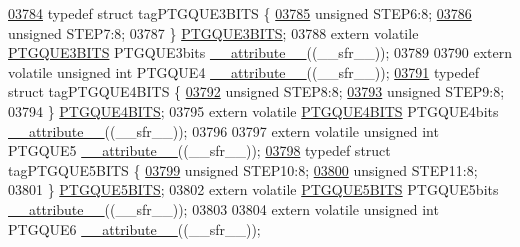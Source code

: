 \begin{DoxyCode}
\hypertarget{a00009_source_l03784}{}\hyperlink{a00008}{03784} \textcolor{keyword}{typedef} \textcolor{keyword}{struct }tagPTGQUE3BITS \{
\hypertarget{a00009_source_l03785}{}\hyperlink{a00008_af6169dff16fd1ea5e34a43bb97bd6218}{03785}   \textcolor{keywordtype}{unsigned} STEP6:8;
\hypertarget{a00009_source_l03786}{}\hyperlink{a00008_a4548344654e1258709b4f446bbe716df}{03786}   \textcolor{keywordtype}{unsigned} STEP7:8;
03787 \} \hyperlink{a00008_d2/d6e/a00667}{PTGQUE3BITS};
03788 \textcolor{keyword}{extern} \textcolor{keyword}{volatile} \hyperlink{a00008_d2/d6e/a00667}{PTGQUE3BITS} PTGQUE3bits \hyperlink{a00009_a493c46f03454991ccc5aa7a6e1dfb2a7}{\_\_attribute\_\_}((\_\_sfr\_\_));
03789 
03790 \textcolor{keyword}{extern} \textcolor{keyword}{volatile} \textcolor{keywordtype}{unsigned} \textcolor{keywordtype}{int}  PTGQUE4 \hyperlink{a00009_a493c46f03454991ccc5aa7a6e1dfb2a7}{\_\_attribute\_\_}((\_\_sfr\_\_));
\hypertarget{a00009_source_l03791}{}\hyperlink{a00008}{03791} \textcolor{keyword}{typedef} \textcolor{keyword}{struct }tagPTGQUE4BITS \{
\hypertarget{a00009_source_l03792}{}\hyperlink{a00008_aa67987ffd757f896712bf2aa6d181b7f}{03792}   \textcolor{keywordtype}{unsigned} STEP8:8;
\hypertarget{a00009_source_l03793}{}\hyperlink{a00008_a85e0900404fd65941708a683dfb7c06a}{03793}   \textcolor{keywordtype}{unsigned} STEP9:8;
03794 \} \hyperlink{a00008_d0/d5c/a00668}{PTGQUE4BITS};
03795 \textcolor{keyword}{extern} \textcolor{keyword}{volatile} \hyperlink{a00008_d0/d5c/a00668}{PTGQUE4BITS} PTGQUE4bits \hyperlink{a00009_a493c46f03454991ccc5aa7a6e1dfb2a7}{\_\_attribute\_\_}((\_\_sfr\_\_));
03796 
03797 \textcolor{keyword}{extern} \textcolor{keyword}{volatile} \textcolor{keywordtype}{unsigned} \textcolor{keywordtype}{int}  PTGQUE5 \hyperlink{a00009_a493c46f03454991ccc5aa7a6e1dfb2a7}{\_\_attribute\_\_}((\_\_sfr\_\_));
\hypertarget{a00009_source_l03798}{}\hyperlink{a00008}{03798} \textcolor{keyword}{typedef} \textcolor{keyword}{struct }tagPTGQUE5BITS \{
\hypertarget{a00009_source_l03799}{}\hyperlink{a00008_a4b2d9015c944b0299d72ebc25947fb2c}{03799}   \textcolor{keywordtype}{unsigned} STEP10:8;
\hypertarget{a00009_source_l03800}{}\hyperlink{a00008_ad3492a875ce1cd997d197ee57c972b55}{03800}   \textcolor{keywordtype}{unsigned} STEP11:8;
03801 \} \hyperlink{a00008_d8/d7a/a00669}{PTGQUE5BITS};
03802 \textcolor{keyword}{extern} \textcolor{keyword}{volatile} \hyperlink{a00008_d8/d7a/a00669}{PTGQUE5BITS} PTGQUE5bits \hyperlink{a00009_a493c46f03454991ccc5aa7a6e1dfb2a7}{\_\_attribute\_\_}((\_\_sfr\_\_));
03803 
03804 \textcolor{keyword}{extern} \textcolor{keyword}{volatile} \textcolor{keywordtype}{unsigned} \textcolor{keywordtype}{int}  PTGQUE6 \hyperlink{a00009_a493c46f03454991ccc5aa7a6e1dfb2a7}{\_\_attribute\_\_}((\_\_sfr\_\_));

\end{DoxyCode}

